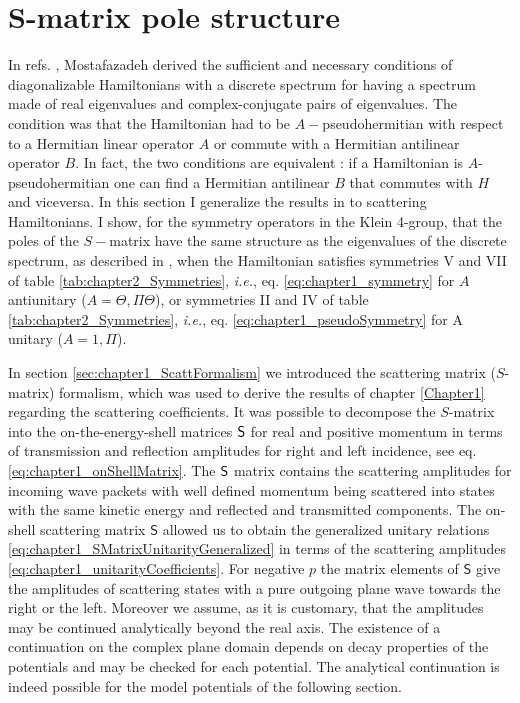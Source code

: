 \section{S-matrix pole structure}
\label{sec:chapter2_SPoles}
%
In refs. \cite{Mostafazadeh2002,Mostafazadeh2002a,Mostafazadeh2002b}, Mostafazadeh derived the sufficient and necessary conditions of diagonalizable Hamiltonians with a discrete spectrum for having a spectrum made of real eigenvalues and complex-conjugate pairs of eigenvalues. The condition was that the Hamiltonian had to be $A-$pseudohermitian with respect to a Hermitian linear operator $A$ or commute with a Hermitian antilinear operator $B$. In fact, the two conditions are equivalent \cite{Mostafazadeh2002b}: if a Hamiltonian is $A$-pseudohermitian one can find a Hermitian antilinear $B$ that commutes with $H$ and viceversa. In this section I generalize the results in \cite{Mostafazadeh2002,Mostafazadeh2002a,Mostafazadeh2002b} to scattering Hamiltonians. I show, for the symmetry operators in the Klein 4-group, that the poles of the $S-$matrix have the same structure as the eigenvalues of the discrete spectrum, as described in \cite{Mostafazadeh2002,Mostafazadeh2002a,Mostafazadeh2002b}, when the Hamiltonian satisfies symmetries V and VII of table \ref{tab:chapter2_Symmetries}, \textit{i.e.}, eq. \eqref{eq:chapter1_symmetry} for $A$ antiunitary ($A = \Theta,\Pi\Theta$), or symmetries II and IV of table \ref{tab:chapter2_Symmetries}, \textit{i.e.}, eq. \eqref{eq:chapter1_pseudoSymmetry} for A unitary ($A = 1,\Pi$).


In section \ref{sec:chapter1_ScattFormalism} we introduced the scattering matrix ($S$-matrix) formalism, which was used to derive the results of chapter \ref{Chapter1} regarding the scattering coefficients. It was possible to decompose the $S$-matrix into the on-the-energy-shell matrices $\sf{S}$ for real and positive momentum in terms of transmission and reflection amplitudes for right
and left incidence, see eq. \eqref{eq:chapter1_onShellMatrix}. The $\sf{S}$ matrix contains the scattering amplitudes for incoming wave packets with well defined momentum being scattered into states with the same kinetic energy and reflected and transmitted components. The on-shell scattering matrix $\mathsf{S}$ allowed us to obtain the generalized unitary relations \eqref{eq:chapter1_SMatrixUnitarityGeneralized} in terms of the scattering amplitudes \eqref{eq:chapter1_unitarityCoefficients}. For negative $p$ the matrix elements of $\mathsf{S}$ give the amplitudes of scattering states with a pure outgoing plane wave towards the right or the left. Moreover we assume, as it is customary, that the amplitudes may be continued analytically beyond the real axis. The existence of a continuation on the complex plane domain depends on decay properties of the potentials and may
be checked for each potential.
The analytical continuation is indeed possible for the model potentials of the following section.

